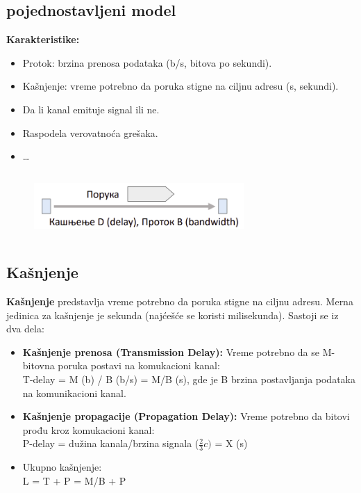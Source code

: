 \documentclass[a4paper]{article}
\begin{document}
    \subsection{pojednostavljeni model}
        \textbf{Karakteristike:}
        \begin{itemize}
            \item Protok: brzina prenosa podataka (b/s, bitova po sekundi).
            \item Kašnjenje: vreme potrebno da poruka stigne na ciljnu adresu (s, sekundi).
            \item Da li kanal emituje signal ili ne.
            \item Raspodela verovatnoća grešaka.
            \item \dots
        \end{itemize}
        \begin{figure}[H]
            \begin{center}
                \includegraphics[width=80mm,height=25mm]{Slike/pojednostavljeni_fizicki.png}
            \end{center}
        \end{figure}
    \subsection{Kašnjenje}
        \textbf{Kašnjenje} predstavlja vreme potrebno da poruka stigne na ciljnu adresu. Merna jedinica
        za kašnjenje je sekunda (najćešće se koristi milisekunda). Sastoji se iz dva dela:
        \begin{itemize}
            \item \textbf{Kašnjenje prenosa (Transmission Delay):} Vreme potrebno da se M-bitovna poruka
                  postavi na komukacioni kanal:\\
                  T-delay = M (b) / B (b/s) = M/B (s), gde je B brzina postavljanja podataka na
                  komunikacioni kanal.
            \item \textbf{Kašnjenje propagacije (Propagation Delay):} Vreme potrebno da bitovi prođu 
                  kroz komukacioni kanal:\\
                  P-delay = dužina kanala/brzina signala ($\frac{2}{3}c)$ = X (s)
            \item Ukupno kašnjenje: \\
                  L = T + P = M/B + P
        \end{itemize}
\end{document}
